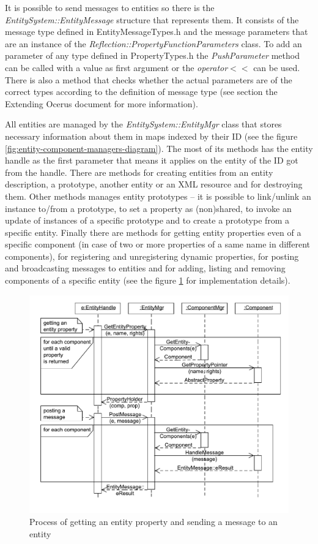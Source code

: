 \documentclass[a4paper, 12pt]{report}
\begin{document}
It is possible to send messages to entities so there is the \emph{EntitySystem::EntityMessage} structure that represents them. It consists of the message type defined in EntityMessageTypes.h and the message parameters that are an instance of the \emph{Reflection::PropertyFunctionParameters} class. To add an parameter of any type defined in PropertyTypes.h the \emph{PushParameter} method can be called with a value as first argument or the \emph{operator}$<<$ can be used. There is also a method that checks whether the actual parameters are of the correct types according to the definition of message type (see section the Extending Ocerus document for more information).

All entities are managed by the \emph{EntitySystem::EntityMgr} class that stores necessary information about them in maps indexed by their ID (see the figure \ref{fig:entity-component-managers-diagram}). The most of its methods has the entity handle as the first parameter that means it applies on the entity of the ID got from the handle. There are methods for creating entities from an entity description, a prototype, another entity or an XML resource and for destroying them. Other methods manages entity prototypes -- it is possible to link/unlink an instance to/from a prototype, to set a property as (non)shared, to invoke an update of instances of a specific prototype and to create a prototype from a specific entity. Finally there are methods for getting entity properties even of a specific component (in case of two or more properties of a same name in different components), for registering and unregistering dynamic properties, for posting and broadcasting messages to entities and for adding, listing and removing components of a specific entity (see the figure \ref{fig:entity-communication-sequence} for implementation details).

\begin{figure}[htbp]
	\centering
		\includegraphics[width=1\textwidth]{EntityCommunicationSequence.pdf}
	\caption[The entity communication sequence diagram]{Process of getting an entity property and sending a message to an entity}
	\label{fig:entity-communication-sequence}
\end{figure}
\end{document}
